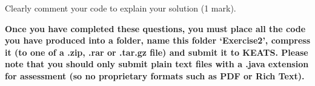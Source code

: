 \documentclass[11pt]{article}
\begin{document}
Clearly comment your code to explain your solution (1 mark).

\textbf{Once you have completed these questions, you must place all the code you have produced into a folder, name this folder `Exercise2', compress it (to one of a .zip, .rar or .tar.gz file) and submit it to KEATS. Please note that you should only submit plain text files with a .java extension for assessment (so no proprietary formats such as PDF or Rich Text).}
\end{document}
